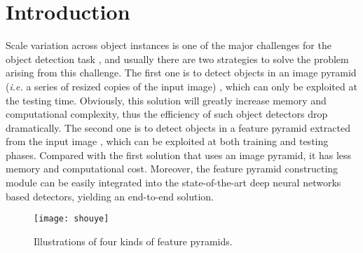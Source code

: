 \documentclass[letterpaper]{article} \usepackage{aaai18}  \usepackage{times}  \usepackage{helvet}  \usepackage{courier}  \usepackage{url}  \usepackage{graphicx}
\begin{document}
\section{Introduction}
Scale variation across object instances is one of the major challenges for the object detection task \cite{LinDGHHB17,HeZR015,abs-1711-08189}, and usually there are two strategies to solve the problem arising from this challenge. The first one is to detect objects in an image pyramid (\textit{i.e.} a series of resized copies of the input image) \cite{abs-1711-08189}, which can only be exploited at the testing time. Obviously, this solution will greatly increase memory and computational complexity, thus the efficiency of such object detectors drop dramatically. The second one is to detect objects in a feature pyramid extracted from the input image \cite{LiuAESRFB16,LinDGHHB17}, which can be exploited at both training and testing phases. Compared with the first solution that uses an image pyramid, it has less memory and computational cost. Moreover, the feature pyramid constructing module can be easily integrated into the state-of-the-art deep neural networks based detectors, yielding an end-to-end solution.

\begin{figure}[t]
\centering
\texttt{[image: shouye]}
\caption{Illustrations of four kinds of feature pyramids.}
\label{fig:pyram}
\end{figure}
\end{document}

